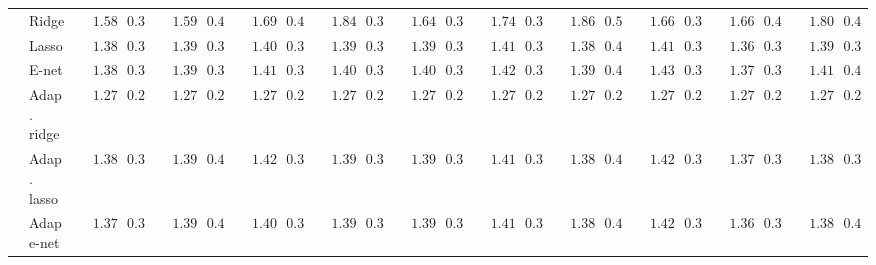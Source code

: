 \begin{tabular}{llllllllllllllllllllll}
	& Ridge  & $\phantom{00}1.586$ & $\phantom{0}0.343$ & $\phantom{00}1.593$ & $\phantom{0}0.408$ & $\phantom{00}1.695$ & $\phantom{0}0.499$ & $\phantom{00}1.843$ & $\phantom{0}0.385$ & $\phantom{00}1.643$ & $\phantom{0}0.333$ & $\phantom{00}1.749$ & $\phantom{0}0.398$ & $\phantom{00}1.866$ & $\phantom{0}0.504$ & $\phantom{00}1.663$ & $\phantom{0}0.351$ & $\phantom{00}1.665$ & $\phantom{0}0.424$ & $\phantom{00}1.801$ & $\phantom{0}0.406$ \\
	& Lasso  & $\phantom{00}1.388$ & $\phantom{0}0.322$ & $\phantom{00}1.390$ & $\phantom{0}0.397$ & $\phantom{00}1.402$ & $\phantom{0}0.349$ & $\phantom{00}1.395$ & $\phantom{0}0.362$ & $\phantom{00}1.399$ & $\phantom{0}0.308$ & $\phantom{00}1.410$ & $\phantom{0}0.319$ & $\phantom{00}1.387$ & $\phantom{0}0.418$ & $\phantom{00}1.418$ & $\phantom{0}0.326$ & $\phantom{00}1.360$ & $\phantom{0}0.301$ & $\phantom{00}1.395$ & $\phantom{0}0.383$ \\
	& E-net  & $\phantom{00}1.385$ & $\phantom{0}0.319$ & $\phantom{00}1.391$ & $\phantom{0}0.386$ & $\phantom{00}1.413$ & $\phantom{0}0.373$ & $\phantom{00}1.407$ & $\phantom{0}0.331$ & $\phantom{00}1.408$ & $\phantom{0}0.313$ & $\phantom{00}1.423$ & $\phantom{0}0.306$ & $\phantom{00}1.390$ & $\phantom{0}0.413$ & $\phantom{00}1.431$ & $\phantom{0}0.321$ & $\phantom{00}1.371$ & $\phantom{0}0.317$ & $\phantom{00}1.411$ & $\phantom{0}0.412$ \\
	& Adap. ridge  & $\phantom{00}1.276$ & $\phantom{0}0.251$ & $\phantom{00}1.276$ & $\phantom{0}0.251$ & $\phantom{00}1.276$ & $\phantom{0}0.251$ & $\phantom{00}1.276$ & $\phantom{0}0.251$ & $\phantom{00}1.276$ & $\phantom{0}0.251$ & $\phantom{00}1.276$ & $\phantom{0}0.251$ & $\phantom{00}1.275$ & $\phantom{0}0.251$ & $\phantom{00}1.276$ & $\phantom{0}0.251$ & $\phantom{00}1.276$ & $\phantom{0}0.251$ & $\phantom{00}1.276$ & $\phantom{0}0.251$ \\
	& Adap. lasso  & $\phantom{00}1.382$ & $\phantom{0}0.334$ & $\phantom{00}1.395$ & $\phantom{0}0.406$ & $\phantom{00}1.422$ & $\phantom{0}0.380$ & $\phantom{00}1.399$ & $\phantom{0}0.333$ & $\phantom{00}1.399$ & $\phantom{0}0.315$ & $\phantom{00}1.417$ & $\phantom{0}0.327$ & $\phantom{00}1.382$ & $\phantom{0}0.417$ & $\phantom{00}1.424$ & $\phantom{0}0.327$ & $\phantom{00}1.373$ & $\phantom{0}0.324$ & $\phantom{00}1.389$ & $\phantom{0}0.387$ \\
	& Adap e-net  & $\phantom{00}1.372$ & $\phantom{0}0.320$ & $\phantom{00}1.390$ & $\phantom{0}0.405$ & $\phantom{00}1.408$ & $\phantom{0}0.373$ & $\phantom{00}1.397$ & $\phantom{0}0.345$ & $\phantom{00}1.390$ & $\phantom{0}0.300$ & $\phantom{00}1.414$ & $\phantom{0}0.312$ & $\phantom{00}1.380$ & $\phantom{0}0.403$ & $\phantom{00}1.427$ & $\phantom{0}0.334$ & $\phantom{00}1.369$ & $\phantom{0}0.316$ & $\phantom{00}1.385$ & $\phantom{0}0.401$ \\

\end{tabular}
